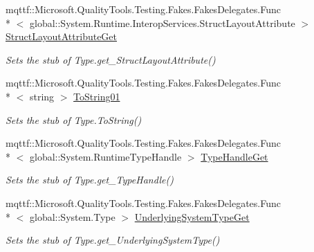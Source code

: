 \begin{DoxyCompactItemize}
mqttf\-::\-Microsoft.\-Quality\-Tools.\-Testing.\-Fakes.\-Fakes\-Delegates.\-Func\\*
$<$ global\-::\-System.\-Runtime.\-Interop\-Services.\-Struct\-Layout\-Attribute $>$ \hyperlink{class_system_1_1_fakes_1_1_stub_type_a4e630b7ebbb466eb8413c9239f8bca58}{Struct\-Layout\-Attribute\-Get}
\begin{DoxyCompactList}\small\item\em Sets the stub of Type.\-get\-\_\-\-Struct\-Layout\-Attribute()\end{DoxyCompactList}\item 
mqttf\-::\-Microsoft.\-Quality\-Tools.\-Testing.\-Fakes.\-Fakes\-Delegates.\-Func\\*
$<$ string $>$ \hyperlink{class_system_1_1_fakes_1_1_stub_type_a7373eab5a6bc6a08705c861de8d941cb}{To\-String01}
\begin{DoxyCompactList}\small\item\em Sets the stub of Type.\-To\-String()\end{DoxyCompactList}\item 
mqttf\-::\-Microsoft.\-Quality\-Tools.\-Testing.\-Fakes.\-Fakes\-Delegates.\-Func\\*
$<$ global\-::\-System.\-Runtime\-Type\-Handle $>$ \hyperlink{class_system_1_1_fakes_1_1_stub_type_a2e23afaee6056126fe3ac92f4ed67c0c}{Type\-Handle\-Get}
\begin{DoxyCompactList}\small\item\em Sets the stub of Type.\-get\-\_\-\-Type\-Handle()\end{DoxyCompactList}\item 
mqttf\-::\-Microsoft.\-Quality\-Tools.\-Testing.\-Fakes.\-Fakes\-Delegates.\-Func\\*
$<$ global\-::\-System.\-Type $>$ \hyperlink{class_system_1_1_fakes_1_1_stub_type_a3053929de40e46581d25619cb6c47495}{Underlying\-System\-Type\-Get}
\begin{DoxyCompactList}\small\item\em Sets the stub of Type.\-get\-\_\-\-Underlying\-System\-Type()\end{DoxyCompactList}\end{DoxyCompactItemize}
